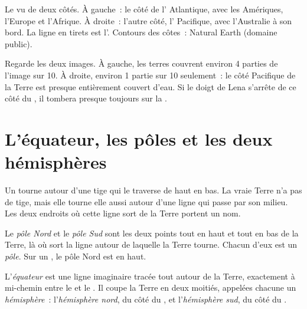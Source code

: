 \begin{omfigure}
{\small Le  vu de deux côtés. À gauche~: le côté de l'
Atlantique, avec les Amériques, l'Europe et l'Afrique. À droite~: l'autre
côté, l' Pacifique, avec l'Australie à son bord. La ligne en tirets
est l'. Contours des côtes~: Natural Earth (domaine public).}
\label{fig:g3:continents-and-oceans:globes}
\end{omfigure}

\begin{remark}\label{rem:g3:continents-and-oceans:halves}
Regarde les deux images. À gauche, les terres couvrent environ 4 parties
de l'image sur 10. À droite, environ 1 partie sur 10 seulement~: le côté
Pacifique de la Terre est presque entièrement couvert d'eau. Si le doigt
de Lena s'arrête de ce côté du , il tombera presque toujours sur la
.
\end{remark}

\section{L'équateur, les pôles et les deux hémisphères}

Un  tourne autour d'une tige qui le traverse de haut en bas. La vraie
Terre n'a pas de tige, mais elle tourne elle aussi autour d'une ligne qui
passe par son milieu. Les deux endroits où cette ligne sort de la Terre
portent un nom.

\begin{definition}[Pôle]\label{def:g3:continents-and-oceans:poles}
Le \emph{pôle Nord} et le
\emph{pôle Sud} sont les deux points tout en haut
et tout en bas de la Terre, là où sort la ligne autour de laquelle la Terre
tourne. Chacun d'eux est un \emph{pôle}. Sur un , le
pôle Nord est en haut.
\end{definition}

\begin{definition}\label{def:g3:continents-and-oceans:equator}
L'\emph{équateur} est une ligne imaginaire tracée
tout autour de la Terre, exactement à mi-chemin entre le  et le
. Il coupe la Terre en deux moitiés, appelées chacune un
\emph{hémisphère}~:
l'\emph{hémisphère nord}, du côté du
, et l'\emph{hémisphère sud},
du côté du .
\end{definition}

